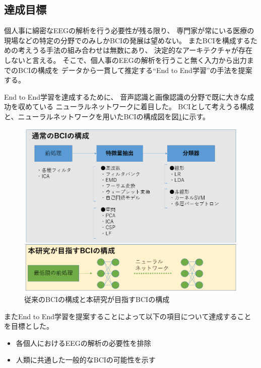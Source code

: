 \subsection{\mc 達成目標}
個人事に綿密なEEGの解析を行う必要性が残る限り、
専門家が常にいる医療の現場などの特定の分野でのみしかBCIの発展は望めない。
またBCIを構成するための考えうる手法の組み合わせは無数にあり、
決定的なアーキテクチャが存在しないと言える。
そこで、個人事のEEGの解析を行うこと無く入力から出力までのBCIの構成を
データから一貫して推定する``End to End学習''の手法を提案する。

End to End学習を達成するために、
音声認識と画像認識の分野で既に大きな成功を収めている
ニューラルネットワークに着目した。
BCIとして考えうる構成と、ニューラルネットワークを用いたBCIの構成図を図\ref{fig:BCIpattern}に示す。
\begin{figure}
    \centering
    \includegraphics[width=12cm]{images/BCIpattern.PNG}
    \caption{従来のBCIの構成と本研究が目指すBCIの構成}
    \label{fig:BCIpattern}
\end{figure}

またEnd to End学習を提案することによって以下の項目について達成することを目標とした。
\begin{itemize}
    \item 各個人におけるEEGの解析の必要性を排除
    \item 人類に共通した一般的なBCIの可能性を示す
\end{itemize}







